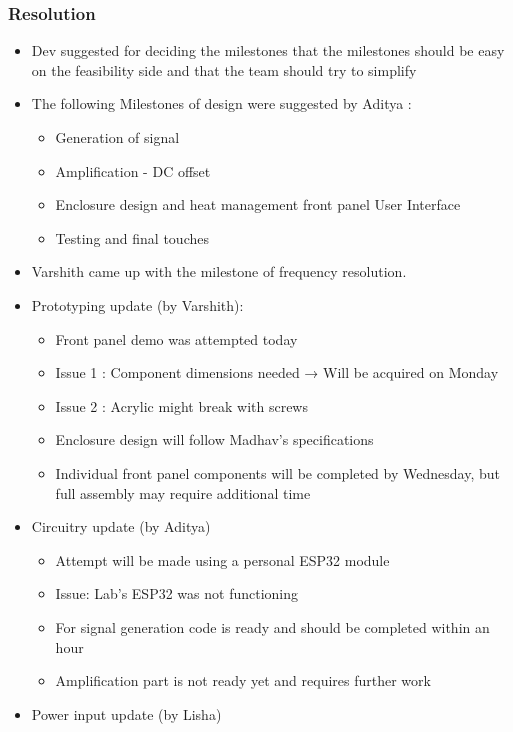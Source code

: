 \documentclass[12pt,a4paper]{article}
\begin{document}
\subsubsection*{Resolution}
\begin{itemize}
    \item Dev suggested for deciding the milestones that the milestones should be easy on the feasibility side and that the team should try to simplify
    \item The following Milestones of design were suggested by Aditya :
    \begin{itemize}
        \item Generation of signal
        \item Amplification - DC offset
        \item Enclosure design and heat management front panel User Interface
        \item Testing and final touches
    \end{itemize}
    \item Varshith came up with the milestone of frequency resolution.
    \item Prototyping update (by Varshith):
    \begin{itemize}
        \item Front panel demo was attempted today
        \item Issue 1 : Component dimensions needed → Will be acquired on Monday
        \item Issue 2 : Acrylic might break with screws
        \item Enclosure design will follow Madhav's specifications
        \item Individual front panel components will be completed by Wednesday, but full assembly may require additional time
    \end{itemize}
    \item Circuitry update (by Aditya)
    \begin{itemize}
         \item Attempt will be made using a personal ESP32 module
         \item Issue: Lab’s ESP32 was not functioning
         \item For signal generation code is ready and should be completed within an hour
         \item Amplification part is not ready yet and requires further work
    \end{itemize}
    \item Power input update (by Lisha)

\end{itemize}
\end{document}
